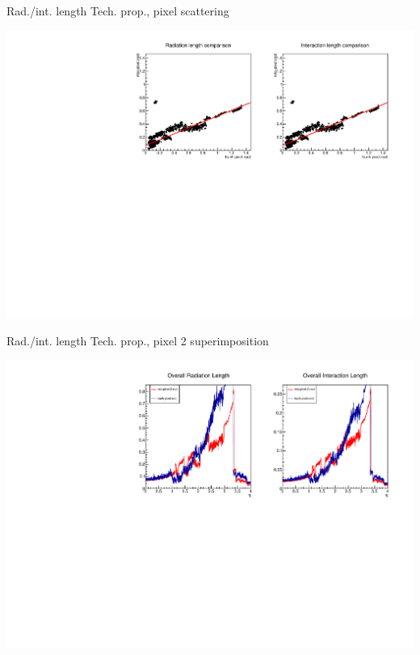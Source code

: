 \documentclass[pdftex, 11pt]{beamer}
\begin{document}
\begin{frame}{Rad./int. length Tech. prop., pixel scattering}
  \begin{center}
    \includegraphics[width=\textwidth]{img/pixel-scattering.pdf}
  \end{center}
\end{frame}

\begin{frame}{Rad./int. length Tech. prop., pixel 2 superimposition}
  \begin{center}
    \includegraphics[width=\textwidth]{img/pixel-2-superimposition.pdf}
  \end{center}
\end{frame}
\end{document}

